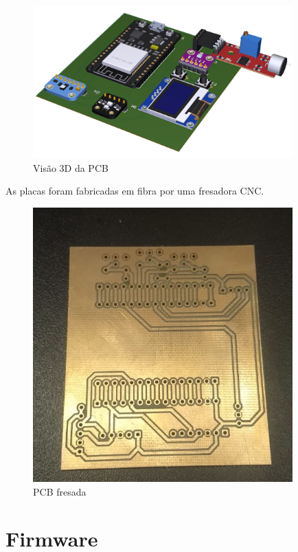 \documentclass[../monografia.tex]{subfiles}
\begin{document}
\begin{figure}[h!]
\centering
\includegraphics[width=10cm]{pcb}
\caption{Visão 3D da PCB}
\label{fig:img4}
\end{figure}

As placas foram fabricadas em fibra por uma fresadora CNC.

\begin{figure}[h!]
\centering
\includegraphics[width=10cm]{pcb-fresada}
\caption{PCB fresada}
\label{fig:img5}
\end{figure}


\section{Firmware}
\end{document}
